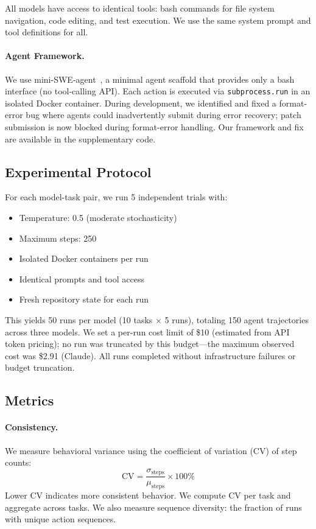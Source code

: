 \documentclass{article}
\begin{document}
All models have access to identical tools: bash commands for file system navigation, code editing, and test execution. We use the same system prompt and tool definitions for all.

\paragraph{Agent Framework.} We use mini-SWE-agent~\citep{swebench}, a minimal agent scaffold that provides only a bash interface (no tool-calling API). Each action is executed via \texttt{subprocess.run} in an isolated Docker container. During development, we identified and fixed a format-error bug where agents could inadvertently submit during error recovery; patch submission is now blocked during format-error handling. Our framework and fix are available in the supplementary code.

\subsection{Experimental Protocol}

For each model-task pair, we run 5 independent trials with:
\begin{itemize}
    \item Temperature: 0.5 (moderate stochasticity)
    \item Maximum steps: 250
    \item Isolated Docker containers per run
    \item Identical prompts and tool access
    \item Fresh repository state for each run
\end{itemize}

This yields 50 runs per model (10 tasks $\times$ 5 runs), totaling 150 agent trajectories across three models. We set a per-run cost limit of \$10 (estimated from API token pricing); no run was truncated by this budget---the maximum observed cost was \$2.91 (Claude). All runs completed without infrastructure failures or budget truncation.

\subsection{Metrics}

\paragraph{Consistency.} We measure behavioral variance using the coefficient of variation (CV) of step counts:
\begin{equation}
    \text{CV} = \frac{\sigma_{\text{steps}}}{\mu_{\text{steps}}} \times 100\%
\end{equation}
Lower CV indicates more consistent behavior. We compute CV per task and aggregate across tasks. We also measure sequence diversity: the fraction of runs with unique action sequences.
\end{document}
